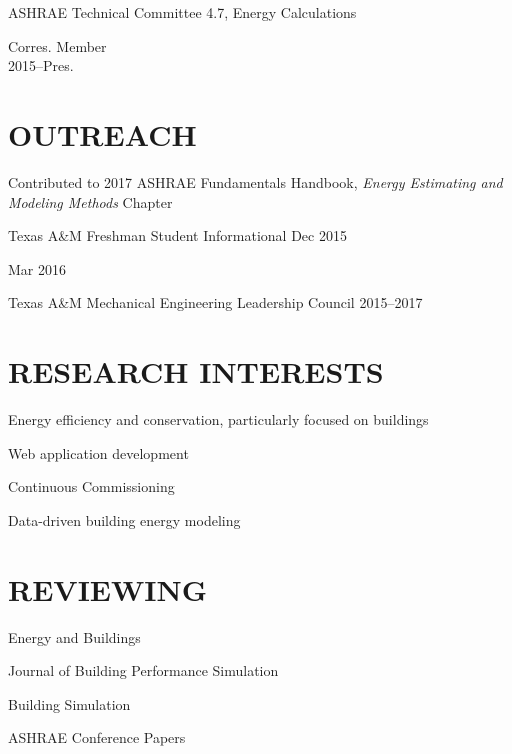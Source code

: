 \documentclass[margin]{res} %
\begin{document}
\begin{resume}
\parbox[t]{9cm}{ASHRAE Technical Committee 4.7, Energy Calculations }\hfill \parbox[t]{3cm}{\raggedleft Corres. Member \\ 2015--Pres.}

\section{OUTREACH}
\parbox[t]{10cm}{Contributed to 2017 ASHRAE Fundamentals Handbook, \textit{Energy Estimating and Modeling Methods} Chapter}

Texas A\&M Freshman Student Informational \hfill Dec 2015\\
\strut \hfill Mar 2016

Texas A\&M Mechanical Engineering Leadership Council \hfill 2015--2017


\section{RESEARCH INTERESTS}

Energy efficiency and conservation, particularly focused on buildings

Web application development

Continuous Commissioning\textsuperscript{\textregistered{}}

Data-driven building energy modeling

\section{REVIEWING}

Energy and Buildings


Journal of Building Performance Simulation

Building Simulation

ASHRAE Conference Papers

\end{resume}

\end{document}
